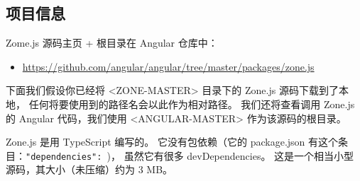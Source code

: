 \subsection{项目信息}


Zome.js 源码主页 + 根目录在 Angular 仓库中：

\begin{itemize}
  \item \url{https://github.com/angular/angular/tree/master/packages/zone.js}
\end{itemize}


下面我们假设你已经将 <ZONE-MASTER> 目录下的 Zone.js 源码下载到了本地，
任何将要使用到的路径名会以此作为相对路径。
我们还将查看调用 Zone.js 的 Angular 代码，我们使用
<ANGULAR-MASTER> 作为该源码的根目录。


Zone.js 是用 TypeScript 编写的。
它没有包依赖（它的 package.json 有这个条目：\texttt{"dependencies": {}})，
虽然它有很多 devDependencies。
这是一个相当小型源码，其大小（未压缩）约为 3 MB。
